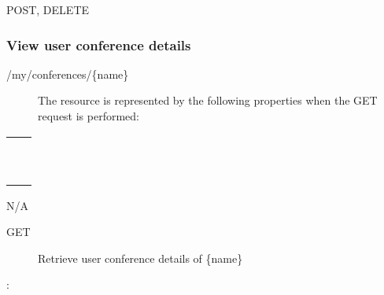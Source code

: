 \documentclass[letterpaper,10pt,english]{sphinxmanual}
\begin{document}
 POST, DELETE


\subsubsection{View user conference details}
\label{\detokenize{restapi:view-user-conference-details}}
 /my/conferences/\{name\}
\begin{description}
\item[{}] \leavevmode
The resource is represented by the following properties when the GET request is performed:

\end{description}


\begin{savenotes}\sphinxattablestart
\centering
\begin{tabulary}{\linewidth}[t]{|T|T|}
\hline

&
\\
\hline
{}
&\\
\hline
{}
&\\
\hline
{}
&\\
\hline
{}
&\\
\hline
{}
&\\
\hline
{}
&\\
\hline
{}
&\\
\hline
{}
&\\
\hline
{}
&\\
\hline
{}
&\\
\hline
\end{tabulary}
\par
\sphinxattableend\end{savenotes}

 N/A
\begin{description}
\item[{ GET}] \leavevmode
Retrieve user conference details of \{name\}

\end{description}

:
\end{document}
